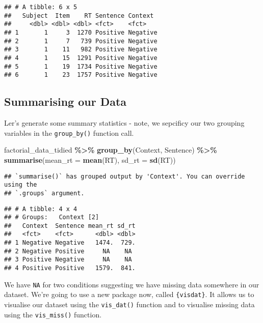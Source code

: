 \documentclass[
]{book}
\newenvironment{Shaded}{\begin{snugshade}}{\end{snugshade}}
\newcommand{\AttributeTok}[1]{\textcolor[rgb]{0.13,0.29,0.53}{#1}}
\newcommand{\FunctionTok}[1]{\textcolor[rgb]{0.13,0.29,0.53}{\textbf{#1}}}
\newcommand{\NormalTok}[1]{#1}
\newcommand{\SpecialCharTok}[1]{\textcolor[rgb]{0.81,0.36,0.00}{\textbf{#1}}}
\begin{document}
\begin{verbatim}
## # A tibble: 6 x 5
##   Subject  Item    RT Sentence Context 
##     <dbl> <dbl> <dbl> <fct>    <fct>   
## 1       1     3  1270 Positive Negative
## 2       1     7   739 Positive Negative
## 3       1    11   982 Positive Negative
## 4       1    15  1291 Positive Negative
## 5       1    19  1734 Positive Negative
## 6       1    23  1757 Positive Negative
\end{verbatim}

\hypertarget{summarising-our-data-2}{%
\subsection{Summarising our Data}\label{summarising-our-data-2}}

Ler's generate some summary statistics - note, we sepcificy our two grouping variables in the \texttt{group\_by()} function call.

\begin{Shaded}
\begin{Highlighting}[]
\NormalTok{factorial\_data\_tidied }\SpecialCharTok{\%\textgreater{}\%}
  \FunctionTok{group\_by}\NormalTok{(Context, Sentence) }\SpecialCharTok{\%\textgreater{}\%}
  \FunctionTok{summarise}\NormalTok{(}\AttributeTok{mean\_rt =} \FunctionTok{mean}\NormalTok{(RT), }\AttributeTok{sd\_rt =} \FunctionTok{sd}\NormalTok{(RT))}
\end{Highlighting}
\end{Shaded}

\begin{verbatim}
## `summarise()` has grouped output by 'Context'. You can override using the
## `.groups` argument.
\end{verbatim}

\begin{verbatim}
## # A tibble: 4 x 4
## # Groups:   Context [2]
##   Context  Sentence mean_rt sd_rt
##   <fct>    <fct>      <dbl> <dbl>
## 1 Negative Negative   1474.  729.
## 2 Negative Positive     NA    NA 
## 3 Positive Negative     NA    NA 
## 4 Positive Positive   1579.  841.
\end{verbatim}

We have \texttt{NA} for two conditions suggesting we have missing data somewhere in our dataset. We're going to use a new package now, called \texttt{\{visdat\}}. It allows us to visualise our dataset using the \texttt{vis\_dat()} function and to visualise missing data using the \texttt{vis\_miss()} function.
\end{document}
